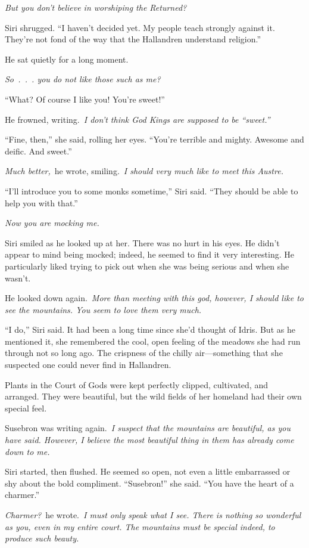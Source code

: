 \textit{But you don’t believe in worshiping the Returned?}

Siri shrugged. “I haven’t decided yet. My people teach strongly against it. They’re not fond of the way that the Hallandren understand religion.”

He sat quietly for a long moment.

\textit{So~.~.~. you do not like those such as me?}

“What? Of course I like you! You’re sweet!”

He frowned, writing.~\textit{I don’t think God Kings are supposed to be “sweet.”}

“Fine, then,” she said, rolling her eyes. “You’re terrible and mighty. Awesome and deific. And sweet.”

\textit{Much better,}~he wrote, smiling.~\textit{I should very much like to meet this Austre.}

“I’ll introduce you to some monks sometime,” Siri said. “They should be able to help you with that.”

\textit{Now you are mocking me.}

Siri smiled as he looked up at her. There was no hurt in his eyes. He didn’t appear to mind being mocked; indeed, he seemed to find it very interesting. He particularly liked trying to pick out when she was being serious and when she wasn’t.

He looked down again.~\textit{More than meeting with this god, however, I should like to see the mountains. You seem to love them very much.}

“I do,” Siri said. It had been a long time since she’d thought of Idris. But as he mentioned it, she remembered the cool, open feeling of the meadows she had run through not so long ago. The crispness of the chilly air—something that she suspected one could never find in Hallandren.

Plants in the Court of Gods were kept perfectly clipped, cultivated, and arranged. They were beautiful, but the wild fields of her homeland had their own special feel.

Susebron was writing again.~\textit{I suspect that the mountains are beautiful, as you have said. However, I believe the most beautiful thing in them has already come down to me.}

Siri started, then flushed. He seemed so open, not even a little embarrassed or shy about the bold compliment. “Susebron!” she said. “You have the heart of a charmer.”

\textit{Charmer?}~he wrote.~\textit{I must only speak what I see. There is nothing so wonderful as you, even in my entire court. The mountains must be special indeed, to produce such beauty.}

